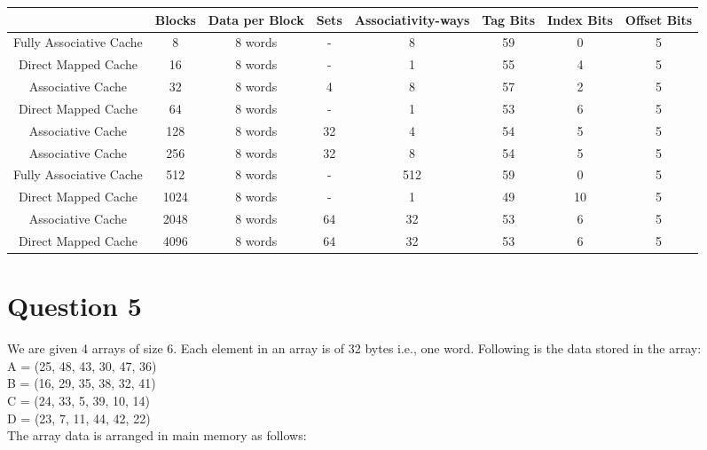\documentclass{article}
\begin{document}
\begin{table}[h]
    \centering
    \begin{tabular}{|c|c|c|c|c|c|c|c|}
        \hline
        \rowcolor[gray]{0.8}
         & Blocks  & Data per Block  & Sets & Associativity-ways & Tag Bits & Index Bits & Offset Bits\\
        \hline
        Fully Associative Cache & 8 & 8 words & \-- & 8 & 59 & 0 & 5\\
        \hline
        Direct Mapped Cache & 16 & 8 words & \-- & 1 & 55 & 4 & 5\\
        \hline
        Associative Cache & 32 & 8 words & 4 & 8 & 57 & 2 & 5\\
        \hline
        Direct Mapped Cache & 64 & 8 words & \-- & 1 & 53 & 6 & 5\\
        \hline
        Associative Cache & 128 & 8 words & 32 & 4 & 54 & 5 & 5\\
        \hline
        Associative Cache & 256 & 8 words & 32 & 8 & 54 & 5 & 5\\
        \hline
        Fully Associative Cache & 512 & 8 words & \-- & 512 & 59 & 0 & 5\\
        \hline
        Direct Mapped Cache & 1024 & 8 words & \-- & 1 & 49 & 10 & 5\\
        \hline
        Associative Cache & 2048 & 8 words & 64 & 32 & 53 & 6 & 5\\
        \hline
        Direct Mapped Cache & 4096 & 8 words & 64 & 32 & 53 & 6 & 5\\
        \hline
    \end{tabular}
    \label{tab:mytable}
\end{table}

\section*{Question 5}

We are given 4 arrays of size 6. Each element in an array is of 32 bytes i.e., one word. Following
is the data stored in the array:
\\A = (25, 48, 43, 30, 47, 36)
\\B = (16, 29, 35, 38, 32, 41)
\\C = (24, 33, 5, 39, 10, 14)
\\D = (23, 7, 11, 44, 42, 22)
\\The array data is arranged in main memory as follows:
\end{document}
